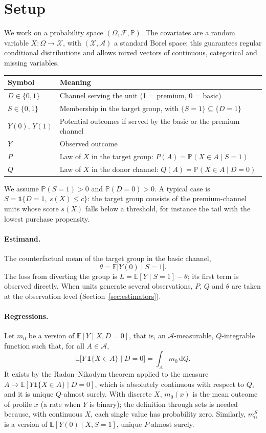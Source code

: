 \documentclass[11pt,a4paper]{article}
\newcommand{\E}{\mathbb{E}}
\newcommand{\PP}{\mathbb{P}}
\newcommand{\ind}{\mathbf{1}}
\newcommand{\X}{\mathcal{X}}
\newcommand{\A}{\mathcal{A}}
\newcommand{\dd}{\,\mathrm{d}}
\theoremstyle{plain}
\theoremstyle{definition}
\begin{document}
\section{Setup}\label{sec:setup}

We work on a probability space $(\Omega,\mathcal F,\PP)$. The covariates are a random variable $X\colon\Omega\to\X$, with $(\X,\A)$ a standard Borel space; this guarantees regular conditional distributions and allows mixed vectors of continuous, categorical and missing variables.

\begin{center}
\begin{tabular}{@{}ll@{}}
\toprule
Symbol & Meaning \\
\midrule
$D\in\{0,1\}$ & Channel serving the unit (1 = premium, 0 = basic) \\
$S\in\{0,1\}$ & Membership in the target group, with $\{S=1\}\subseteq\{D=1\}$ \\
$Y(0),\,Y(1)$ & Potential outcomes if served by the basic or the premium channel \\
$Y$ & Observed outcome \\
$P$ & Law of $X$ in the target group: $P(A)=\PP(X\in A\mid S=1)$ \\
$Q$ & Law of $X$ in the donor channel: $Q(A)=\PP(X\in A\mid D=0)$ \\
\bottomrule
\end{tabular}
\end{center}

We assume $\PP(S=1)>0$ and $\PP(D=0)>0$. A typical case is $S=\ind\{D=1,\ s(X)\le c\}$: the target group consists of the premium-channel units whose score $s(X)$ falls below a threshold, for instance the tail with the lowest purchase propensity.

\paragraph{Estimand.} The counterfactual mean of the target group in the basic channel,
\[
\theta=\E\bigl[Y(0)\mid S=1\bigr].
\]
The loss from diverting the group is $L=\E[Y\mid S=1]-\theta$; its first term is observed directly. When units generate several observations, $P$, $Q$ and $\theta$ are taken at the observation level (Section~\ref{sec:estimators}).

\paragraph{Regressions.} Let $m_0$ be a version of $\E[Y\mid X,D=0]$, that is, an $\A$-measurable, $Q$-integrable function such that, for all $A\in\A$,
\[
\E\bigl[Y\,\ind\{X\in A\}\mid D=0\bigr]=\int_A m_0\dd Q .
\]
It exists by the Radon--Nikodym theorem applied to the measure $A\mapsto\E[Y\ind\{X\in A\}\mid D=0]$, which is absolutely continuous with respect to $Q$, and it is unique $Q$-almost surely. With discrete $X$, $m_0(x)$ is the mean outcome of profile $x$ (a rate when $Y$ is binary); the definition through sets is needed because, with continuous $X$, each single value has probability zero. Similarly, $m_0^S$ is a version of $\E[Y(0)\mid X,S=1]$, unique $P$-almost surely.
\end{document}
